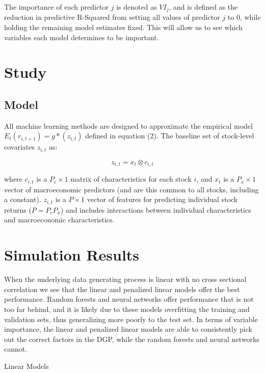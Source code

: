 \documentclass[a4paper, table]{article}
\begin{document}
The importance of each predictor $j$ is denoted as $VI_j$, and is defined as the reduction in predictive R-Squared from setting all values of predictor $j$ to 0, while holding the remaining model estimates fixed. This will allow us to see which variables each model determines to be important. 

\section{Study}



\subsection{Model}

All machine learning methods are designed to approximate the empirical model \( E_t(r_{i, t+1}) = g*(z_{i,t}) \) defined in equation (2). The baseline set of stock-level covariates \( z_{i,t} \) as:

\begin{equation}
	z_{i,t} = x_t \otimes c_{i,t}
\end{equation}

where \( c_{i,t} \) is a \( P_c \times 1 \) matrix of characteristics for each stock \(i\), and \(x_t\) is a $P_x \times 1$ vector of macroeconomic predictors (and are this common to all stocks, including a constant). $z_{i,t}$ is a $P \times 1$ vector of features for predicting individual stock returns ($P = P_cP_x$) and includes interactions between individual characteristics and macroeconomic characteristics. 

\section{Simulation Results}

When the underlying data generating process is linear with no cross sectional correlation we see that the linear and penalized linear models offer the best performance. Random forests and neural networks offer performance that is not too far behind, and it is likely due to these models overfitting the training and validation sets, thus generalizing more poorly to the test set. In terms of variable importance, the linear and penalized linear models are able to consistently pick out the correct factors in the DGP, while the random forests and neural networks cannot.

Linear Models
\end{document}

